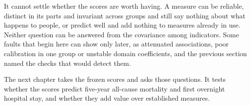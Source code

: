 It cannot settle whether the scores are worth having. A measure can be reliable, distinct in its parts and invariant across groups and still say nothing about what happens to people, or predict well and add nothing to measures already in use. Neither question can be answered from the covariance among indicators. Some faults that begin here can show only later, as attenuated associations, poor calibration in one group or unstable domain coefficients, and the previous section named the checks that would detect them.

The next chapter takes the frozen scores and asks those questions. It tests whether the scores predict five-year all-cause mortality and first overnight hospital stay, and whether they add value over established measures.